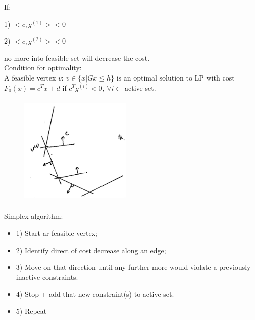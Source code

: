 If:

1) $<c, g^{(1)}> < 0$

2) $<c, g^{(2)}> < 0$

no more into feasible set will decrease the cost.\\ 

Condition for optimality:\\

A feasible vertex $v$: $v\in\{x|Gx \leq h \}$ is an optimal solution to LP with cost $F_0(x) = c^Tx + d$ if $c^Tg^{(i)} < 0$, $\forall i\in$ active set.\\

\begin{figure}
	\centering
	\includegraphics[width=2.1in,height=2.1in]{figures/ch07/figure1012_9.png}
\end{figure}


Simplex algorithm:

\begin{itemize}
	\item 1) Start ar feasible vertex;
	
	\item 2) Identify direct of cost decrease along an edge;
	
	\item 3) Move on that direction until any further more would violate a previously inactive constraints.
	
	\item 4) Stop + add that new constraint(s) to active set.
	
	\item 5) Repeat
\end{itemize}






